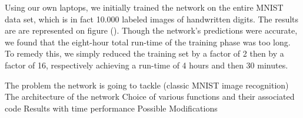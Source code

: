   

\stopsubsection


\startsubssection[title=Results]
Using our own laptops, we initially trained the network on the entire MNIST data set, which is in fact 10.000 labeled images of handwritten digits.
The results are are represented on figure ().
Though the network's predictions were accurate, we found that the eight-hour total run-time of the training phase  was too long.
To remedy this, we simply reduced the training set by a factor of 2 then by a factor of 16, respectively achieving a run-time of 4 hours and then 30 minutes. 





\stopsubsection

\startitemize
\startitem 
The problem the network is going to tackle (classic MNIST image recognition)
\stopitem
\startitem
The architecture of the network
\stopitem
\startitem
Choice of various functions and their associated code
\stopitem
\startitem
Results with time performance
\stopitem
\startitem
Possible Modifications
\stopitem
\stopitemize
\stopsection
